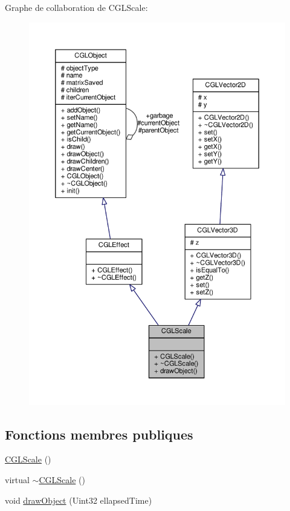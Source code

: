 Graphe de collaboration de C\-G\-L\-Scale\-:
\nopagebreak
\begin{figure}[H]
\begin{center}
\leavevmode
\includegraphics[width=350pt]{dd/d3a/class_c_g_l_scale__coll__graph}
\end{center}
\end{figure}
\subsection*{Fonctions membres publiques}
\begin{DoxyCompactItemize}
\item 
\hyperlink{class_c_g_l_scale_a48ed3886215e1ee3ae43fedae36cf426}{C\-G\-L\-Scale} ()
\item 
virtual \hyperlink{class_c_g_l_scale_a8a084fe6407bc5226723dd6300089cce}{$\sim$\-C\-G\-L\-Scale} ()
\item 
void \hyperlink{class_c_g_l_scale_a27939db2fb5f900800f391bb06a387a4}{draw\-Object} (Uint32 ellapsed\-Time)
\end{DoxyCompactItemize}
